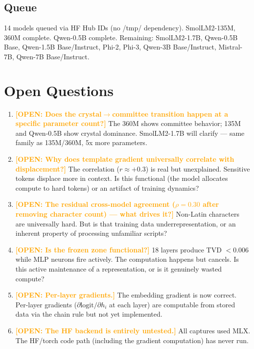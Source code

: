 \documentclass[11pt]{article}
\newcommand{\open}[1]{\textcolor{orange}{\textbf{[OPEN: #1]}}}
\begin{document}
\subsection{Queue}
14 models queued via HF Hub IDs (no /tmp/ dependency). SmolLM2-135M, 360M complete. Qwen-0.5B complete. Remaining: SmolLM2-1.7B, Qwen-0.5B Base, Qwen-1.5B Base/Instruct, Phi-2, Phi-3, Qwen-3B Base/Instruct, Mistral-7B, Qwen-7B Base/Instruct.

\section{Open Questions}

\begin{enumerate}
\item \open{Does the crystal$\to$committee transition happen at a specific parameter count?} The 360M shows committee behavior; 135M and Qwen-0.5B show crystal dominance. SmolLM2-1.7B will clarify --- same family as 135M/360M, 5x more parameters.

\item \open{Why does template gradient universally correlate with displacement?} The correlation ($r \approx +0.3$) is real but unexplained. Sensitive tokens displace more in context. Is this functional (the model allocates compute to hard tokens) or an artifact of training dynamics?

\item \open{The residual cross-model agreement ($\rho = 0.30$ after removing character count) --- what drives it?} Non-Latin characters are universally hard. But is that training data underrepresentation, or an inherent property of processing unfamiliar scripts?

\item \open{Is the frozen zone functional?} 18 layers produce TVD $< 0.006$ while MLP neurons fire actively. The computation happens but cancels. Is this active maintenance of a representation, or is it genuinely wasted compute?

\item \open{Per-layer gradients.} The embedding gradient is now correct. Per-layer gradients ($\partial \text{logit} / \partial h_i$ at each layer) are computable from stored data via the chain rule but not yet implemented.

\item \open{The HF backend is entirely untested.} All captures used MLX. The HF/torch code path (including the gradient computation) has never run.
\end{enumerate}
\end{document}
